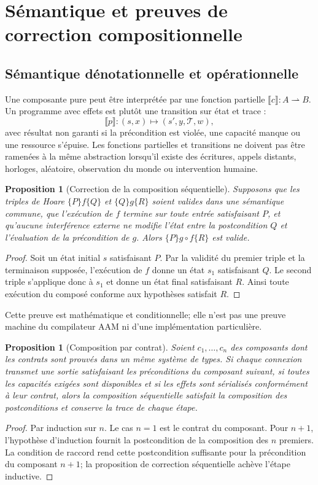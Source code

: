 \documentclass[11pt,a4paper]{article}
\newcommand{\trace}{\mathcal{T}}
\theoremstyle{definition}
\theoremstyle{plain}
\newtheorem{proposition}[definition]{Proposition}
\theoremstyle{remark}
\begin{document}
\section{Sémantique et preuves de correction compositionnelle}
\subsection{Sémantique dénotationnelle et opérationnelle}
Une composante pure peut être interprétée par une fonction partielle $\llbracket c\rrbracket:A\rightharpoonup B$. Un programme avec effets est plutôt une transition sur état et trace :
\[
\llbracket p\rrbracket: (s,x)\mapsto (s',y,\trace,w),
\]
avec résultat non garanti si la précondition est violée, une capacité manque ou une ressource s'épuise. Les fonctions partielles et transitions ne doivent pas être ramenées à la même abstraction lorsqu'il existe des écritures, appels distants, horloges, aléatoire, observation du monde ou intervention humaine.

\begin{proposition}[Correction de la composition séquentielle]
Supposons que les triples de Hoare $\{P\}f\{Q\}$ et $\{Q\}g\{R\}$ soient valides dans une sémantique commune, que l'exécution de $f$ termine sur toute entrée satisfaisant $P$, et qu'aucune interférence externe ne modifie l'état entre la postcondition $Q$ et l'évaluation de la précondition de $g$. Alors $\{P\}g\circ f\{R\}$ est valide.
\end{proposition}
\begin{proof}
Soit un état initial $s$ satisfaisant $P$. Par la validité du premier triple et la terminaison supposée, l'exécution de $f$ donne un état $s_1$ satisfaisant $Q$. Le second triple s'applique donc à $s_1$ et donne un état final satisfaisant $R$. Ainsi toute exécution du composé conforme aux hypothèses satisfait $R$.
\end{proof}
Cette preuve est mathématique et conditionnelle; elle n'est pas une preuve machine du compilateur AAM ni d'une implémentation particulière.

\begin{proposition}[Composition par contrat]
Soient $c_1,\ldots,c_n$ des composants dont les contrats sont prouvés dans un même système de types. Si chaque connexion transmet une sortie satisfaisant les préconditions du composant suivant, si toutes les capacités exigées sont disponibles et si les effets sont sérialisés conformément à leur contrat, alors la composition séquentielle satisfait la composition des postconditions et conserve la trace de chaque étape.
\end{proposition}
\begin{proof}
Par induction sur $n$. Le cas $n=1$ est le contrat du composant. Pour $n+1$, l'hypothèse d'induction fournit la postcondition de la composition des $n$ premiers. La condition de raccord rend cette postcondition suffisante pour la précondition du composant $n+1$; la proposition de correction séquentielle achève l'étape inductive.
\end{proof}
\end{document}
